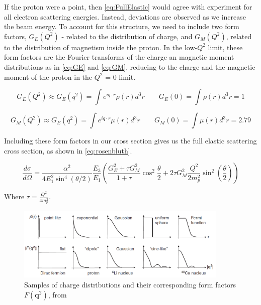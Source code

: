             \indent If the proton were a point, then \eqref{eq:FullElastic} would agree with experiment for all electron scattering energies. Instead, deviations are observed as we increase the beam energy. To account for this structure, we need to include two form factors, $G_E(Q^2)$ - related to the distribution of charge, and $G_M(Q^2)$, related to the distribution of magnetism inside the proton. In the low-$Q^2$ limit, these form factors are the Fourier transforms of the charge an magnetic moment distributions as in \eqref{eq:GE} and \ref{eq:GM}, reducing to the charge and the magnetic moment of the proton in the $Q^2$ = 0 limit. %

        \begin{equation}\label{eq:GE}
             G_E(Q^2) \approx G_E(q^2) = \int e^{iq\cdot r} \rho (r) d^3r  \quad \quad    G_E(0) = \int  \rho (r) d^3r = 1
        \end{equation}

        \begin{equation}\label{eq:GM}
             G_M(Q^2) \approx G_E(q^2) = \int e^{iq\cdot r} \mu (r) d^3r  \quad \quad  G_M(0) = \int  \mu (r) d^3r = 2.79
        \end{equation}
        
        
        Including these form factors in our cross section gives us the full elastic scattering cross section, as shown in \eqref{eq:rosenbluth}.
                
        \begin{equation}\label{eq:rosenbluth}
            \frac{d\sigma}{d\Omega} = \frac{\alpha^2}{4E_1^2\sin^4{(\theta/2)}}\frac{E_3}{E_1}\left( \frac{G_E^2+\tau G_M^2}{1+\tau} \cos^2{\frac{\theta}{2}}+2\tau G_M^2\frac{Q^2}{2m_p^2}\sin^2(\frac{\theta}{2})\right)
        \end{equation}
       
        Where $\tau = \frac{Q^2}{4m_p^2}$.
        

        \begin{figure}[H]
            \centering
            \includegraphics[width=0.9\textwidth]{Chapters/Ch1-Intro/Ch1-Sec1-Background/pics/intro/possibleformfactors.png}
            \caption[Fourier Transforms of Charge Distributions]{Samples of charge distributions and their corresponding form factors $F(\textbf{q}^2)$, from \parencite{Thomson2013ModernPhysics} }
            \label{fig:formfactors}
        \end{figure}
        

